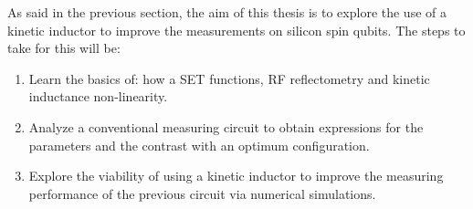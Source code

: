 \documentclass[../main.tex]{subfiles}
\begin{document}
As said in the previous section, the aim of this thesis is to explore the use
of a kinetic inductor to improve the measurements on silicon spin qubits. The
steps to take for this will be:

\begin{enumerate}
    \item Learn the basics of: how a SET functions, RF reflectometry
        and kinetic inductance non-linearity.
    \item Analyze a conventional measuring circuit to obtain expressions for
        the parameters and the contrast with an optimum configuration.
    \item Explore the viability of using a kinetic inductor to improve the
        measuring performance of the previous circuit via numerical
        simulations.
\end{enumerate}
\end{document}
